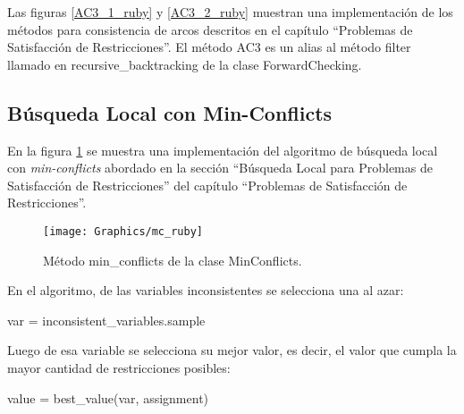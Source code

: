Las figuras \ref{AC3_1_ruby} y \ref{AC3_2_ruby} muestran una implementaci\'on de los m\'etodos para consistencia de arcos descritos en el cap\'itulo ``Problemas de Satisfacci\'on de Restricciones''. El m\'etodo \textsf{AC3} es un alias al m\'etodo \textsf{filter} llamado en \textsf{recursive\_backtracking} de la clase \textsf{ForwardChecking}.

\subsection{B\'usqueda Local con Min-Conflicts}

En la figura \ref{mc_ruby} se muestra una implementaci\'on del algoritmo de b\'usqueda local con \emph{min-conflicts} abordado en la secci\'on ``B\'usqueda Local para Problemas de Satisfacci\'on de Restricciones'' del cap\'itulo ``Problemas de Satisfacci\'on de Restricciones''. 

\begin{figure}[h]
	\begin{center}
		\texttt{[image: Graphics/mc\_ruby]}
		\caption{M\'etodo \textsf{min\_conflicts} de la clase \textsf{MinConflicts}.}
		\label{mc_ruby}
	\end{center}	
\end{figure}

En el algoritmo, de las variables inconsistentes se selecciona una al azar:
\begin{center}	\textsf{var = inconsistent\_variables.sample}	\end{center}

Luego de esa variable se selecciona su mejor valor, es decir, el valor que cumpla la mayor cantidad de restricciones posibles:
\begin{center}	\textsf{value = best\_value(var, assignment)}	\end{center}

